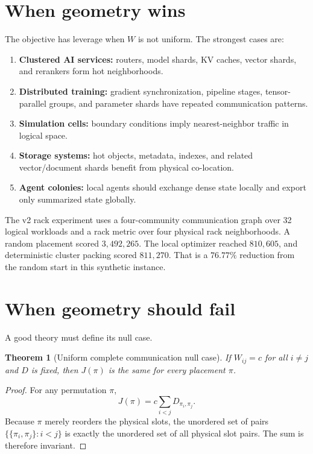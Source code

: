 \documentclass[11pt]{article}
\newtheorem{theorem}{Theorem}[section]
\theoremstyle{remark}
\begin{document}
\section{When geometry wins}

The objective has leverage when $W$ is not uniform. The strongest cases are:
\begin{enumerate}[leftmargin=*]
\item \textbf{Clustered AI services:} routers, model shards, KV caches, vector shards, and rerankers form hot neighborhoods.
\item \textbf{Distributed training:} gradient synchronization, pipeline stages, tensor-parallel groups, and parameter shards have repeated communication patterns.
\item \textbf{Simulation cells:} boundary conditions imply nearest-neighbor traffic in logical space.
\item \textbf{Storage systems:} hot objects, metadata, indexes, and related vector/document shards benefit from physical co-location.
\item \textbf{Agent colonies:} local agents should exchange dense state locally and export only summarized state globally.
\end{enumerate}

The v2 rack experiment uses a four-community communication graph over 32 logical workloads and a rack metric over four physical rack neighborhoods. A random placement scored $3{,}492{,}265$. The local optimizer reached $810{,}605$, and deterministic cluster packing scored $811{,}270$. That is a $76.77\%$ reduction from the random start in this synthetic instance.

\section{When geometry should fail}

A good theory must define its null case.

\begin{theorem}[Uniform complete communication null case]
If $W_{ij}=c$ for all $i\ne j$ and $D$ is fixed, then $J(\pi)$ is the same for every placement $\pi$.
\end{theorem}

\begin{proof}
For any permutation $\pi$,
\[
J(\pi)=c\sum_{i<j}D_{\pi_i,\pi_j}.
\]
Because $\pi$ merely reorders the physical slots, the unordered set of pairs $\{\{\pi_i,\pi_j\}:i<j\}$ is exactly the unordered set of all physical slot pairs. The sum is therefore invariant.
\end{proof}
\end{document}
